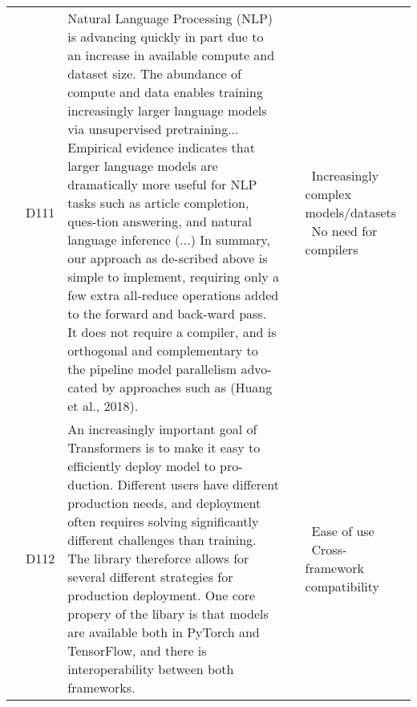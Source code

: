 {\begin{longtable}{|l|p{0.6cm}|p{11.8cm}|p{0.6cm}|p{2cm}|}
         & \label{D111}D111\newline\centering\cite{shoeybi_megatron-lm_2020} & Natural Language Processing (NLP) is advancing quickly in part due to an increase in available compute and dataset size. The abundance of compute and data enables training increasingly larger language models via unsupervised pretraining... Empirical evidence indicates that larger language models are dramatically more useful for NLP tasks such as article completion, ques-tion answering, and natural language inference (...) In summary, our approach as de-scribed above is simple to implement, requiring only a few extra all-reduce operations added to the forward and back-ward pass. It does not require a compiler, and is orthogonal and complementary to the pipeline model parallelism advo-cated by approaches such as (Huang et al., 2018).
	     & \cite{shoeybi_megatron-lm_2020,chen_mxnet_2015,lepikhin_gshard_2020}
	     & \textbullet\ Increasingly complex models/datasets \newline \textbullet\ No need for compilers \\ \cline{2-5}
         & \label{D112}D112\newline\centering\cite{wolf_huggingfaces_2020} & An increasingly important goal of Transformers is to make it easy to efficiently deploy model to pro-duction. Different users have different production needs, and deployment often requires solving significantly different challenges than training. The library thereforce allows for several different strategies for production deployment.
         One core propery of the libary is that models are available both in PyTorch and TensorFlow, and there is interoperability between both frameworks. 
	     & \cite{wolf_huggingfaces_2020,sergeev_horovod_2018,rasley_deepspeed_2020}
	     & \textbullet\ Ease of use \newline \textbullet\ Cross-framework compatibility \\ \hline


\end{longtable}}

